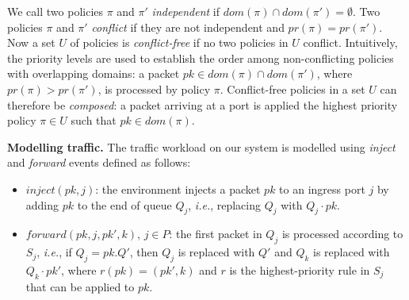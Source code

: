 \documentclass[11pt,pdftex,letter]{article}
\newcommand{\dom}{\textit{dom}}
\newcommand{\pr}{\textit{pr}}
\newcommand{\ie}{{\it i.e.}}
\newcommand{\mcnote}[1]{\textcolor{heraldBlue}{\small \bf [MC: #1]}}
\newcommand{\ssnote}[1]{\textcolor{heraldBlue}{\small \bf [SS: #1]}}
\newcommand{\mcnote}[1]{}
\newcommand{\ssnote}[1]{}
\begin{document}
We call two policies $\pi$ and $\pi'$ \emph{independent} if
$\dom(\pi)\cap \dom(\pi')= \emptyset$.
Two policies $\pi$ and $\pi'$ \emph{conflict} if they are not
independent and $\pr(\pi)=\pr(\pi')$.
%
Now a set $U$ of policies is \emph{conflict-free} if
no two policies in $U$ conflict.
Intuitively, the priority levels are used to establish the order among
non-conflicting policies with overlapping domains: a packet
$pk\in\dom(\pi)\cap \dom(\pi')$, where $\pr(\pi)>\pr(\pi')$,  is
processed by policy $\pi$.
%
Conflict-free policies in a set $U$ can therefore be \emph{composed}:
a packet arriving at a port is applied the highest priority policy
$\pi\in U$ such that
$\textit{pk}\in\dom(\pi)$.


\vspace{1mm}\noindent\textbf{Modelling traffic.}
%
The traffic workload on our system is modelled using \textit{inject}
and \textit{forward} events defined as follows:
\begin{itemize}
\item $\textit{inject}(pk,j)$: the environment injects a packet $pk$
  to an ingress port $j$ by adding $pk$ to the end of queue $Q_j$,
  \ie, replacing $Q_j$ with $Q_j\cdot pk$.
\item $\textit{forward}(pk,j,pk',k)$, $j \in P$:
  the first packet in $Q_j$ is processed
  according to $S_j$, \ie, if $Q_j=pk.Q'$, then $Q_j$ is
  replaced with $Q'$ and  $Q_k$ is
  replaced with $Q_k\cdot pk'$, where $r(pk)=(pk',k)$ and $r$ is the
  highest-priority rule in $S_j$ that can be applied to $pk$.
\end{itemize}
\end{document}
